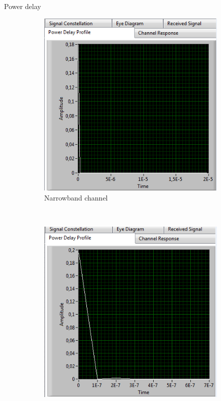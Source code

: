 \documentclass{beamer}
\begin{document}
\begin{frame}{Power delay}
                \begin{figure}[h!]
                    \centering
                    \begin{subfigure}[b]{0.45 \textwidth}
                        \includegraphics[width=\textwidth]{narrowT.PNG}
                        \caption{Narrowband channel}\label{fig:2}
                    \end{subfigure}
                    ~
                    \begin{subfigure}[b]{0.45 \textwidth}
                   \includegraphics[width=\textwidth]{wideT.PNG}

\end{subfigure}
\end{figure}
\end{frame}
\end{document}
